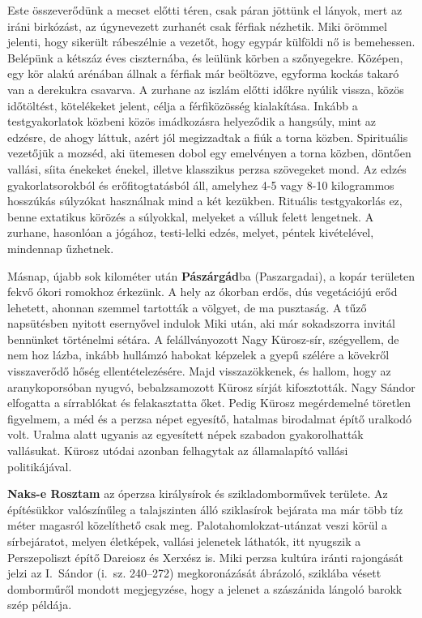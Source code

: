 Este összeverődünk a mecset előtti téren, csak páran jöttünk el
lányok, mert az iráni birkózást, az úgynevezett zurhanét csak férfiak
nézhetik. Miki örömmel jelenti, hogy sikerült rábeszélnie a vezetőt,
hogy egypár külföldi nő is bemehessen. Belépünk a kétszáz éves ciszternába,
és leülünk körben a szőnyegekre. Középen, egy kör alakú arénában
állnak a férfiak már beöltözve, egyforma kockás takaró van a
derekukra csavarva. A zurhane az iszlám előtti időkre nyúlik vissza,
közös időtöltést, kötelékeket jelent, célja a férfiközösség kialakítása.
Inkább a testgyakorlatok közbeni közös imádkozásra helyeződik
a hangsúly, mint az edzésre, de ahogy láttuk, azért jól megizzadtak
a fiúk a torna közben. Spirituális vezetőjük a mozséd, aki ütemesen
dobol egy emelvényen a torna közben, döntően vallási, síita énekeket
énekel, illetve klasszikus perzsa szövegeket mond. Az edzés gyakorlatsorokból
és erőfitogtatásból áll, amelyhez 4-5 vagy 8-10 kilogrammos
hosszúkás súlyzókat használnak mind a két kezükben. Rituális testgyakorlás
ez, benne extatikus körözés a súlyokkal, melyeket a válluk
felett lengetnek. A zurhane, hasonlóan a jógához, testi-lelki edzés,
melyet, péntek kivételével, mindennap űzhetnek.

Másnap, újabb sok kilométer után \textbf{Pászárgád}ba (Paszargadai),
a kopár területen fekvő ókori romokhoz érkezünk. A hely az ókorban
erdős, dús vegetációjú erőd lehetett, ahonnan szemmel tartották a völgyet,
de ma pusztaság. A tűző napsütésben nyitott esernyővel indulok
Miki után, aki már sokadszorra invitál bennünket történelmi sétára.
A felállványozott Nagy Kürosz-sír, szégyellem, de nem hoz lázba, inkább
hullámzó habokat képzelek a gyepű szélére a kövekről visszaverődő
hőség ellentételezésére. Majd visszazökkenek, és hallom, hogy az
aranykoporsóban nyugvó, bebalzsamozott Kürosz sírját kifosztották.
Nagy Sándor elfogatta a sírrablókat és felakasztatta őket. Pedig Kürosz
megérdemelné töretlen figyelmem, a méd és a perzsa népet egyesítő,
hatalmas birodalmat építő uralkodó volt. Uralma alatt ugyanis az
egyesített népek szabadon gyakorolhatták vallásukat. Kürosz utódai
azonban felhagytak az államalapító vallási politikájával.

\textbf{Naks-e Rosztam} az óperzsa királysírok és szikladomborművek területe.
Az építésükkor valószínűleg a talajszinten álló sziklasírok bejárata
ma már több tíz méter magasról közelíthető csak meg. Palotahomlokzat-utánzat
veszi körül a sírbejáratot, melyen életképek, vallási jelenetek
láthatók, itt nyugszik a Perszepoliszt építő Dareiosz és Xerxész is. Miki
perzsa kultúra iránti rajongását jelzi az I.~Sándor (i.~sz. 240--272)
megkoronázását ábrázoló, sziklába vésett domborműről mondott megjegyzése,
hogy a jelenet a szászánida lángoló barokk szép példája.

